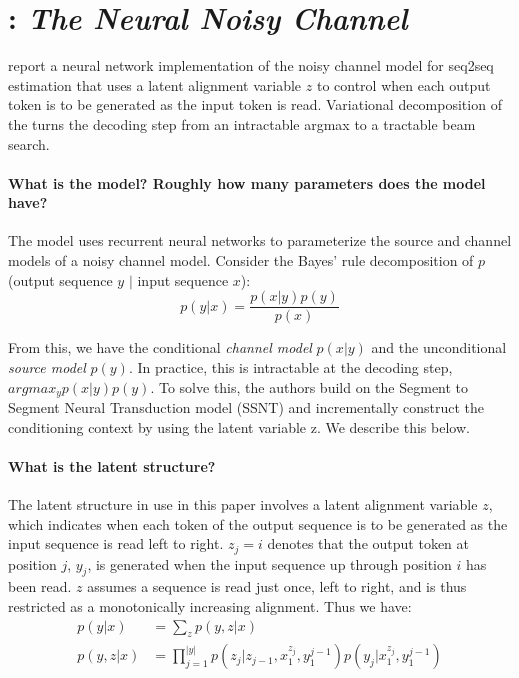 \documentclass[11pt]{article}
\begin{document}
\section{\cite{yu2016neural}: \textit{The Neural Noisy Channel}}

\cite{yu2016neural} report a neural network implementation of the noisy channel model for seq2seq estimation that uses a latent alignment variable $z$ to control when each output token is to be generated as the input token is read. Variational decomposition of the turns the decoding step from an intractable argmax to a tractable beam search.

\paragraph{What is the model? Roughly how many parameters does the model have?} The model uses recurrent neural networks to parameterize the source and channel models of a noisy channel model. Consider the Bayes' rule decomposition of $p$(output sequence $y$ $|$ input sequence $x$):
$$p(y|x) = \frac{p(x|y)p(y)}{p(x)}$$

From this, we have the conditional \textit{channel model} $p(x|y)$ and the unconditional \textit{source model} $p(y)$. In practice, this is intractable at the decoding step, $argmax_y p(x|y)p(y)$. To solve this, the authors build on the Segment to Segment Neural Transduction model (SSNT) and incrementally construct the conditioning context by using the latent variable z. We describe this below.

\paragraph{What is the latent structure?} The latent structure in use in this paper involves a latent alignment variable $z$, which indicates when each token of the output sequence is to be generated as the input sequence is read left to right. $z_j=i$ denotes that the output token at position $j$, $y_j$, is generated when the input sequence up through position $i$ has been read. $z$ assumes a sequence is read just once, left to right, and is thus restricted as a monotonically increasing alignment. Thus we have:
\begin{align*}
  p(y|x) &= \sum_z p(y,z|x) \\
  p(y,z|x) &= \prod_{j=1}^{|y|} p(z_j | z_{j-1},x_1^{z_j},y_1^{j-1}) p(y_j|x_1^{z_j},y_1^{j-1})
\end{align*}
\end{document}
